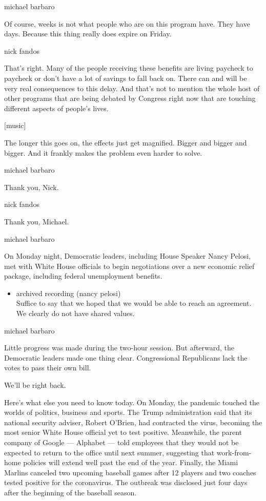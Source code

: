 michael barbaro

Of course, weeks is not what people who are on this program have. They
have days. Because this thing really does expire on Friday.

nick fandos

That's right. Many of the people receiving these benefits are living
paycheck to paycheck or don't have a lot of savings to fall back on.
There can and will be very real consequences to this delay. And that's
not to mention the whole host of other programs that are being debated
by Congress right now that are touching different aspects of people's
lives.

{[}music{]}

The longer this goes on, the effects just get magnified. Bigger and
bigger and bigger. And it frankly makes the problem even harder to
solve.

michael barbaro

Thank you, Nick.

nick fandos

Thank you, Michael.

michael barbaro

On Monday night, Democratic leaders, including House Speaker Nancy
Pelosi, met with White House officials to begin negotiations over a new
economic relief package, including federal unemployment benefits.

\begin{itemize}
\tightlist
\item
  archived recording (nancy pelosi)\\
  Suffice to say that we hoped that we would be able to reach an
  agreement. We clearly do not have shared values.
\end{itemize}

michael barbaro

Little progress was made during the two-hour session. But afterward, the
Democratic leaders made one thing clear. Congressional Republicans lack
the votes to pass their own bill.

We'll be right back.

Here's what else you need to know today. On Monday, the pandemic touched
the worlds of politics, business and sports. The Trump administration
said that its national security adviser, Robert O'Brien, had contracted
the virus, becoming the most senior White House official yet to test
positive. Meanwhile, the parent company of Google --- Alphabet --- told
employees that they would not be expected to return to the office until
next summer, suggesting that work-from-home policies will extend well
past the end of the year. Finally, the Miami Marlins canceled two
upcoming baseball games after 12 players and two coaches tested positive
for the coronavirus. The outbreak was disclosed just four days after the
beginning of the baseball season.

